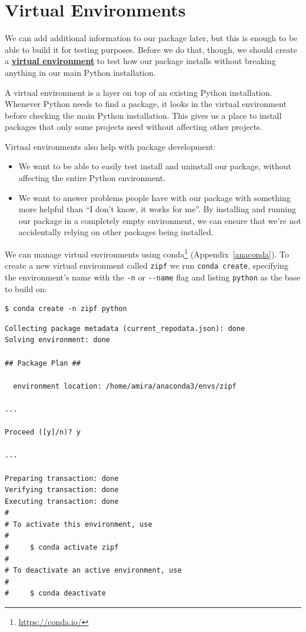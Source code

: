 \documentclass[
]{krantz}
\providecommand{\tightlist}{%
  \setlength{\itemsep}{0pt}\setlength{\parskip}{0pt}}
\renewcommand{\href}[2]{#2\footnote{\url{#1}}}
\newcommand{\gref}[2]{\hyperlink{#2}{\textbf{#1}}}
\begin{document}
\hypertarget{packaging-virtualenv}{%
\section{Virtual Environments}\label{packaging-virtualenv}}

We can add additional information to our package later,
but this is enough to be able to build it for testing purposes.
Before we do that,
though,
we should create a \gref{virtual environment}{virtual\_environment}
to test how our package installs
without breaking anything in our main Python installation.

A virtual environment is a layer on top of an existing Python installation.
Whenever Python needs to find a package,
it looks in the virtual environment before checking the main Python installation.
This gives us a place to install packages that only some projects need
without affecting other projects.

Virtual environments also help with package development:

\begin{itemize}
\tightlist
\item
  We want to be able to easily test install and uninstall our package,
  without affecting the entire Python environment.
\item
  We want to answer problems people have with our package with something more helpful than
  ``I don't know, it works for me''.
  By installing and running our package in a completely empty environment,
  we can ensure that we're not accidentally relying on other packages being installed.
\end{itemize}

We can manage virtual environments using \href{https://conda.io/}{conda} (Appendix~\ref{anaconda}).
To create a new virtual environment called \texttt{zipf} we run \texttt{conda\ create},
specifying the environment's name with the \texttt{-n} or \texttt{-\/-name} flag
and listing \texttt{python} as the base to build on:

\begin{verbatim}
$ conda create -n zipf python
\end{verbatim}

\begin{verbatim}
Collecting package metadata (current_repodata.json): done
Solving environment: done

## Package Plan ##

  environment location: /home/amira/anaconda3/envs/zipf

...

Proceed ([y]/n)? y

...

Preparing transaction: done
Verifying transaction: done
Executing transaction: done
#
# To activate this environment, use
#
#     $ conda activate zipf
#
# To deactivate an active environment, use
#
#     $ conda deactivate
\end{verbatim}
\end{document}
